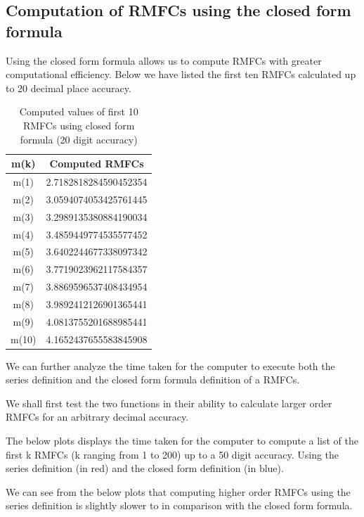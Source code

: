 \documentclass[12pt]{article}
\numberwithin{equation}{section}
\begin{document}
\subsection{Computation of RMFCs using the closed form formula}
\par
Using the closed form formula allows us to compute RMFCs with greater computational efficiency. Below we have listed the first ten RMFCs calculated up to 20 decimal place accuracy.
\begin{table}[h!]
\centering
\begin{tabular}{cc}
\hline
m(k) & Computed RMFCs \\ \hline
m(1) & 2.7182818284590452354 \\
m(2) & 3.0594074053425761445 \\
m(3) & 3.2989135380884190034 \\
m(4) & 3.4859449774535577452 \\
m(5) & 3.6402244677338097342 \\
m(6) & 3.7719023962117584357 \\
m(7) & 3.8869596537408434954 \\
m(8) & 3.9892412126901365441 \\
m(9) & 4.0813755201688985441 \\
m(10) & 4.1652437655583845908 \\ \hline
\end{tabular}
\caption{ Computed values of first 10 RMFCs using closed form formula (20 digit accuracy)}
\label{tab:closedformrmfcvalues}
\end{table}
\par We can further analyze the time taken for the computer to execute both the series definition and the closed form formula definition of a RMFCs.\par
We shall first test the two functions in their ability to calculate larger order RMFCs for an arbitrary decimal accuracy.\par
The below plots displays the time taken for the computer to compute a list of the first k RMFCs (k ranging from 1 to 200) up to a 50 digit accuracy. Using the series definition (in red) and the closed form definition (in blue).\par
We can see from the below plots that computing higher order RMFCs using the series definition is slightly slower to in comparison with the closed form formula.
\end{document}
